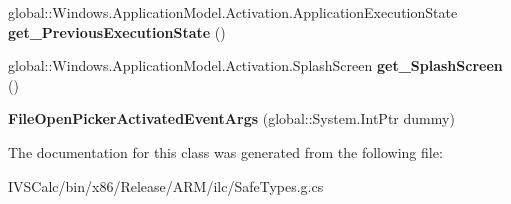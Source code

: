 \begin{DoxyCompactItemize}
global\+::\+Windows.\+Application\+Model.\+Activation.\+Application\+Execution\+State {\bfseries get\+\_\+\+Previous\+Execution\+State} ()
\item 
\mbox{\label{class_windows_1_1_application_model_1_1_activation_1_1_file_open_picker_activated_event_args_a3395084a778307a4f086d5f43330d8a9}} 
global\+::\+Windows.\+Application\+Model.\+Activation.\+Splash\+Screen {\bfseries get\+\_\+\+Splash\+Screen} ()
\item 
\mbox{\label{class_windows_1_1_application_model_1_1_activation_1_1_file_open_picker_activated_event_args_ae106dba9758a64d75cd44ac97ab3ff2f}} 
{\bfseries File\+Open\+Picker\+Activated\+Event\+Args} (global\+::\+System.\+Int\+Ptr dummy)
\end{DoxyCompactItemize}


The documentation for this class was generated from the following file\+:\begin{DoxyCompactItemize}
\item 
I\+V\+S\+Calc/bin/x86/\+Release/\+A\+R\+M/ilc/Safe\+Types.\+g.\+cs\end{DoxyCompactItemize}
